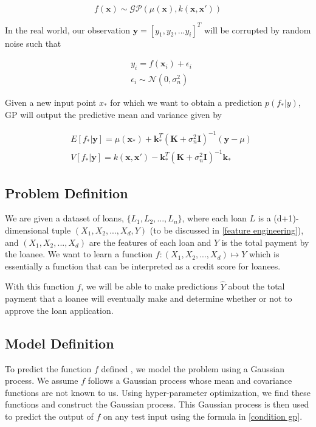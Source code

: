 \documentclass[a4paper]{article}
\theoremstyle{genius}
\begin{document}
\[f(\textbf{x}) \sim \mathcal{GP}(\mu(\textbf{x}), k(\textbf{x}, \textbf{x}'))\]

In the real world, our observation $\textbf{y}=[y_1,y_2,...y_i]^T$ will be corrupted by random noise such that 

\begin{align*}
	& y_i = f(\textbf{x}_i) + \epsilon_i \\
	& \epsilon_i \sim\mathcal{N}(0, \sigma^2_n)
\end{align*}

Given a new input point $x_*$ for which we want to obtain a prediction $p(f_*|y)$, GP will output the predictive mean and variance given by

\begin{align} \label{condition gp}
	& E[f_*|\textbf{y}]=\mu(\textbf{x}_*)+\textbf{k}_*^T(\textbf{K}+\sigma_n^2\textbf{I})^{-1} (\textbf{y}-\mu)\\
	& V[f_*|\textbf{y}]=k(\textbf{x}, \textbf{x}')-\textbf{k}_*^T(\textbf{K}+\sigma_n^2\textbf{I})^{-1}\textbf{k}_*
\end{align}


\subsection{Problem Definition} \label{problem definition} 
We are given a dataset of loans, $\{L_1, L_2, ... , L_n\}$, where each loan $L$ is a (d+1)-dimensional tuple $(X_1, X_2, ... , X_d, Y)$ (to be discussed in \ref{feature engineering}), and $(X_1, X_2, ... , X_d) $ are the features of each loan and $Y$ is the total payment by the loanee. We want to learn a function $f: (X_1, X_2, ... , X_d) \mapsto Y$ which is essentially a function that can be interpreted as a credit score for loanees.

With this function $f$, we will be able to make predictions $\hat{Y}$ about the total payment that a loanee will eventually make and determine whether or not to approve the loan application.

\subsection{Model Definition}
To predict the function $f$ defined , we model the problem using a Gaussian process. We assume $f$ follows a Gaussian process 
whose mean and covariance functions are not known to us. Using hyper-parameter optimization, we find these functions and construct the Gaussian process. This Gaussian process is then used to predict the output of $f$ on any test input using the formula in \ref{condition gp}.\\
\end{document}
